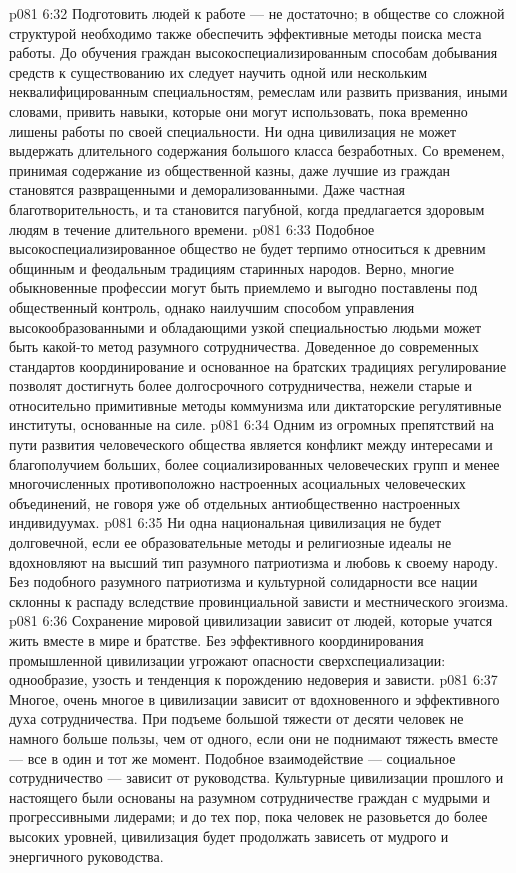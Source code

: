 \vs p081 6:32 Подготовить людей к работе --- не достаточно; в обществе со сложной структурой необходимо также обеспечить эффективные методы поиска места работы. До обучения граждан высокоспециализированным способам добывания средств к существованию их следует научить одной или нескольким неквалифицированным специальностям, ремеслам или развить призвания, иными словами, привить навыки, которые они могут использовать, пока временно лишены работы по своей специальности. Ни одна цивилизация не может выдержать длительного содержания большого класса безработных. Со временем, принимая содержание из общественной казны, даже лучшие из граждан становятся развращенными и деморализованными. Даже частная благотворительность, и та становится пагубной, когда предлагается здоровым людям в течение длительного времени.
\vs p081 6:33 Подобное высокоспециализированное общество не будет терпимо относиться к древним общинным и феодальным традициям старинных народов. Верно, многие обыкновенные профессии могут быть приемлемо и выгодно поставлены под общественный контроль, однако наилучшим способом управления высокообразованными и обладающими узкой специальностью людьми может быть какой\hyp{}то метод разумного сотрудничества. Доведенное до современных стандартов координирование и основанное на братских традициях регулирование позволят достигнуть более долгосрочного сотрудничества, нежели старые и относительно примитивные методы коммунизма или диктаторские регулятивные институты, основанные на силе.
\vs p081 6:34 \bibnobreakspace {} Одним из огромных препятствий на пути развития человеческого общества является конфликт между интересами и благополучием больших, более социализированных человеческих групп и менее многочисленных противоположно настроенных асоциальных человеческих объединений, не говоря уже об отдельных антиобщественно настроенных индивидуумах.
\vs p081 6:35 Ни одна национальная цивилизация не будет долговечной, если ее образовательные методы и религиозные идеалы не вдохновляют на высший тип разумного патриотизма и любовь к своему народу. Без подобного разумного патриотизма и культурной солидарности все нации склонны к распаду вследствие провинциальной зависти и местнического эгоизма.
\vs p081 6:36 Сохранение мировой цивилизации зависит от людей, которые учатся жить вместе в мире и братстве. Без эффективного координирования промышленной цивилизации угрожают опасности сверхспециализации: однообразие, узость и тенденция к порождению недоверия и зависти.
\vs p081 6:37 \bibnobreakspace {} Многое, очень многое в цивилизации зависит от вдохновенного и эффективного духа сотрудничества. При подъеме большой тяжести от десяти человек не намного больше пользы, чем от одного, если они не поднимают тяжесть вместе --- все в один и тот же момент. Подобное взаимодействие --- социальное сотрудничество --- зависит от руководства. Культурные цивилизации прошлого и настоящего были основаны на разумном сотрудничестве граждан с мудрыми и прогрессивными лидерами; и до тех пор, пока человек не разовьется до более высоких уровней, цивилизация будет продолжать зависеть от мудрого и энергичного руководства.
